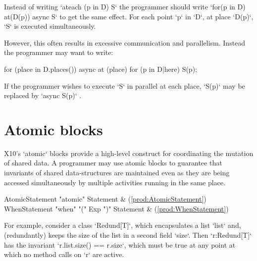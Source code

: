 Instead of writing \xcd`ateach (p in D) S` the programmer should write 
\xcd`for(p in D) at(D(p)) async S` to get the same effect. 
For each point \xcd`p` in \xcd`D`, at place \xcd`D(p)`, \xcd`S` is
executed simultaneously.

However, this often results in excessive communication and parallelism. Instead the
programmer may want to write: 
\begin{xten}
for (place in D.places()) async at (place) {
    for (p in D|here) {
        S(p);
    }
}
\end{xten}

If the programmer wishes to execute \xcd`S` in parallel at each place,
\xcd`S(p)` may be replaced by 
\xcd`async S(p)`
.




\section{Atomic blocks}\label{AtomicBlocks}

X10's \xcd`atomic` blocks provide a high-level construct for coordinating
the mutation of shared data. 
A programmer may use atomic blocks to guarantee that invariants of
shared data-structures are maintained even as they are being accessed
simultaneously by multiple activities running in the same place.  

\begin{bbgrammar}
 AtomicStatement    \: \xcd"atomic" Statement & (\ref{prod:AtomicStatement})\\%
 WhenStatement    \: \xcd"when" \xcd"(" Exp \xcd")" Statement & (\ref{prod:WhenStatement})\\%
\end{bbgrammar}

For example, consider a class \xcd`Redund[T]`, which encapsulates a list
\xcd`list` and, (redundantly) keeps the size of the list in a second field
\xcd`size`.  Then \xcd`r:Redund[T]` has the invariant 
\xcd`r.list.size() == r.size`, which must be true at any point at which
no method calls on \xcd`r` are active.

